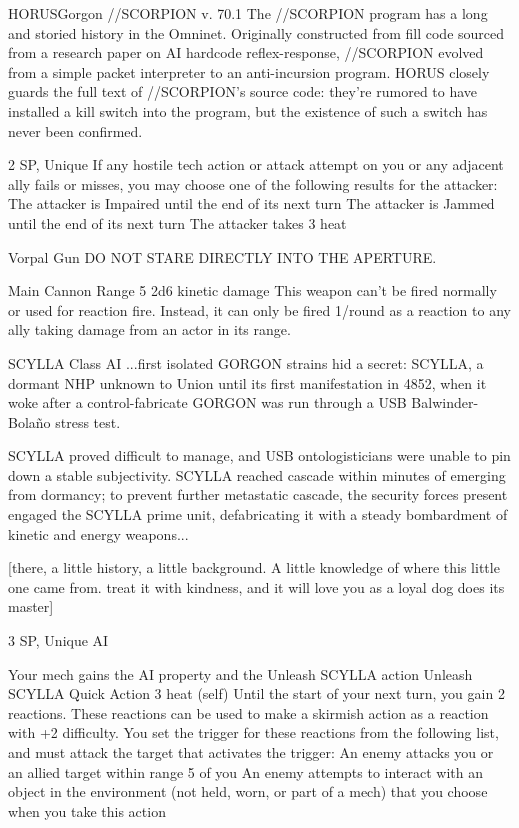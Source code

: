 \begin{mech}{HORUS}{Gorgon}
//SCORPION v. 70.1
The //SCORPION program has a long and storied history in the Omninet. Originally constructed from fill code sourced from a research paper on AI hardcode reflex-response, //SCORPION evolved from a simple packet interpreter to an anti-incursion program. HORUS closely guards the full text of //SCORPION's source code: they're rumored to have installed a kill switch into the program, but the existence of such a switch has never been confirmed.

2 SP, Unique
If any hostile tech action or attack attempt on you or any adjacent ally fails or misses, you may choose one of the following results for the attacker:
The attacker is Impaired until the end of its next turn
The attacker is Jammed until the end of its next turn
The attacker takes 3 heat

Vorpal Gun
DO NOT STARE DIRECTLY INTO THE APERTURE.

Main Cannon
Range 5
2d6 kinetic damage
This weapon can't be fired normally or used for reaction fire. Instead, it can only be fired 1/round as a reaction to any ally taking damage from an actor in its range.

SCYLLA Class AI
...first isolated GORGON strains hid a secret: SCYLLA, a dormant NHP unknown to Union until its first manifestation in 4852, when it woke after a control-fabricate GORGON was run through a USB Balwinder-Bolaño stress test.

SCYLLA proved difficult to manage, and USB ontologisticians were unable to pin down a stable subjectivity. SCYLLA reached cascade within minutes of emerging from dormancy; to prevent further metastatic cascade, the security forces present engaged the SCYLLA prime unit, defabricating it with a steady bombardment of kinetic and energy weapons...

[there, a little history, a little background. A little knowledge of where this little one came from. treat it with kindness, and it will love you as a loyal dog does its master]

3 SP, Unique
AI

Your mech gains the AI property and the Unleash SCYLLA action
Unleash SCYLLA
Quick Action
  	3 heat (self)
Until the start of your next turn, you gain 2 reactions. These reactions can be used to make a skirmish action as a reaction with +2 difficulty. You set the trigger for these reactions from the following list, and must attack the target that activates the trigger:
An enemy attacks you or an allied target within range 5 of you
An enemy attempts to interact with an object in the environment (not held, worn, or part of a mech) that you choose when you take this action


\end{mech}
